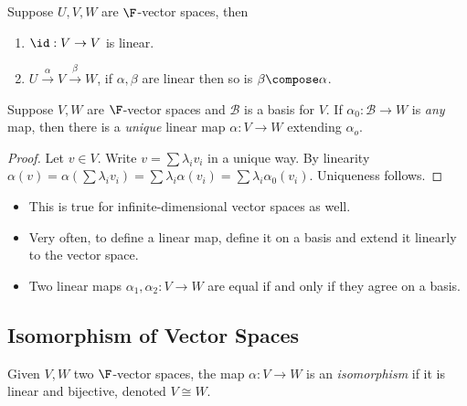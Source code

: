 \documentclass[a4paper]{article}
\newcommand*{\basis}{\mathcal}
\theoremstyle{definition}
\begin{document}
\begin{note}
  Suppose \(U, V, W\) are \(\F\)-vector spaces, then
  \begin{enumerate}
  \item \(\id: V\to V\) is linear.
  \item \(U \stackrel{\alpha}{\to} V \stackrel{\beta}{\to} W\), if \(\alpha, \beta\) are linear then so is \(\beta \compose \alpha\).
  \end{enumerate}
\end{note}

\begin{lemma}
  Suppose \(V, W\) are \(\F\)-vector spaces and \(\basis B\) is a basis for \(V\). If \(\alpha_0: \basis B\to W\) is \emph{any} map, then there is a \emph{unique} linear map \(\alpha: V\to W\) extending \(\alpha_o\).
\end{lemma}

\begin{proof}
  Let \(v\in V\). Write \(v = \sum \lambda_iv_i\) in a unique way. By linearity \(\alpha(v) = \alpha(\sum \lambda_iv_i) = \sum \lambda_i \alpha(v_i) = \sum \lambda_i \alpha_0(v_i)\). Uniqueness follows.
\end{proof}

\begin{note}\leavevmode
  \begin{itemize}
  \item This is true for infinite-dimensional vector spaces as well.
  \item Very often, to define a linear map, define it on a basis and extend it linearly to the vector space.
  \item Two linear maps \(\alpha_1,\alpha_2: V\to W\) are equal if and only if they agree on a basis.
  \end{itemize}
\end{note}

\subsection{Isomorphism of Vector Spaces}

\begin{definition}[Isomorphism]
  Given \(V, W\) two \(\F\)-vector spaces, the map \(\alpha:V\to W\) is an \emph{isomorphism} if it is linear and bijective, denoted \(V \cong W\).
\end{definition}
\end{document}
